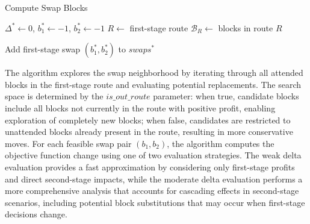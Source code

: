 \begin{algorithm}[h!]
	\caption{Compute Swap Blocks} \label{alg:compute-swap-blocks}
	\SetAlgoLined

	$\Delta^* \leftarrow 0$, $b_1^* \leftarrow -1$, $b_2^* \leftarrow -1$\;
	$R \leftarrow$ first-stage route\;
	$\mathcal{B}_R \leftarrow$ blocks in route $R$\;

	Add first-stage swap $(b_1^*, b_2^*)$ to $swaps^*$\;
	\;
\end{algorithm}

The algorithm explores the swap neighborhood by iterating through all attended blocks in the first-stage route and evaluating potential replacements. The search space is determined by the $is\_out\_route$ parameter: when true, candidate blocks include all blocks not currently in the route with positive profit, enabling exploration of completely new blocks; when false, candidates are restricted to unattended blocks already present in the route, resulting in more conservative moves. For each feasible swap pair $(b_1, b_2)$, the algorithm computes the objective function change using one of two evaluation strategies. The weak delta evaluation provides a fast approximation by considering only first-stage profits and direct second-stage impacts, while the moderate delta evaluation performs a more comprehensive analysis that accounts for cascading effects in second-stage scenarios, including potential block substitutions that may occur when first-stage decisions change.


